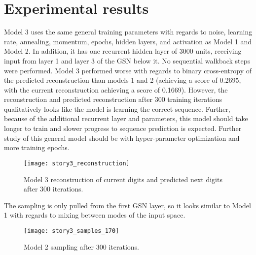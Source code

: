 \section{Experimental results}
Model 3 uses the same general training parameters with regards to noise, learning rate, annealing, momentum, epochs, hidden layers, and activation as Model 1 and Model 2. In addition, it has one recurrent hidden layer of 3000 units, receiving input from layer 1 and layer 3 of the GSN below it. No sequential walkback steps were performed. Model 3 performed worse with regards to binary cross-entropy of the predicted reconstruction than models 1 and 2 (achieving a score of 0.2695, with the current reconstruction achieving a score of 0.1669). However, the reconstruction and predicted reconstruction after 300 training iterations qualitatively looks like the model is learning the correct sequence. Further, because of the additional recurrent layer and parameters, this model should take longer to train and slower progress to sequence prediction is expected. Further study of this general model should be with hyper-parameter optimization and more training epochs.

\begin{figure}[h!]
  \centering
    \texttt{[image: story3\_reconstruction]}
\caption{Model 3 reconstruction of current digits and predicted next digits after 300 iterations.}
\end{figure}

The sampling is only pulled from the first GSN layer, so it looks similar to Model 1 with regards to mixing between modes of the input space.
\begin{figure}[h!]
  \centering
    \texttt{[image: story3\_samples\_170]}
\caption{Model 2 sampling after 300 iterations.}
\end{figure}
